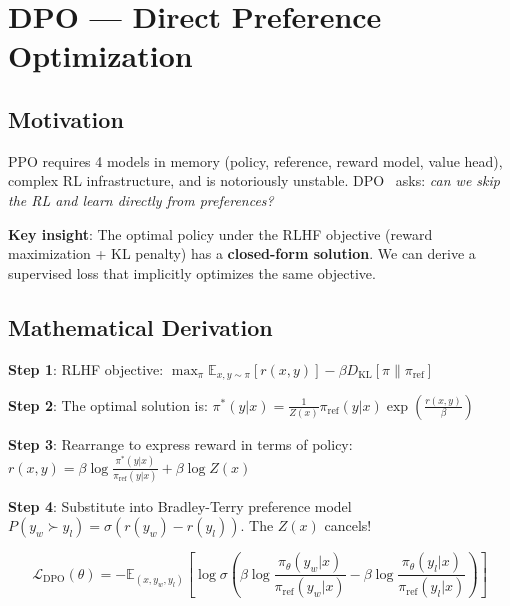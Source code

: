 \chapter{DPO --- Direct Preference Optimization}
\label{dpo-direct-preference-optimization}

\section{Motivation}
\label{motivation}

PPO requires 4 models in memory (policy, reference, reward model, value head), complex RL infrastructure, and is notoriously unstable. DPO~\cite{rafailov2023direct} asks: \emph{can we skip the RL and learn directly from preferences?}

\textbf{Key insight}: The optimal policy under the RLHF objective (reward maximization + KL penalty) has a \textbf{closed-form solution}. We can derive a supervised loss that implicitly optimizes the same objective.

\section{Mathematical Derivation}
\label{mathematical-derivation}

\textbf{Step 1}: RLHF objective: $\max_\pi \mathbb{E}_{x,y\sim\pi}[r(x,y)] - \beta D_\text{KL}[\pi\|\pi_\text{ref}]$

\textbf{Step 2}: The optimal solution is: $\pi^*(y|x) = \frac{1}{Z(x)} \pi_\text{ref}(y|x) \exp\left(\frac{r(x,y)}{\beta}\right)$

\textbf{Step 3}: Rearrange to express reward in terms of policy: $r(x,y) = \beta \log \frac{\pi^*(y|x)}{\pi_\text{ref}(y|x)} + \beta \log Z(x)$

\textbf{Step 4}: Substitute into Bradley-Terry preference model $P(y_w \succ y_l) = \sigma(r(y_w) - r(y_l))$. The $Z(x)$ cancels!

\begin{equation}
\boxed{\mathcal{L}_\text{DPO}(\theta) = -\mathbb{E}_{(x, y_w, y_l)}\left[\log\sigma\left(\beta\log\frac{\pi_\theta(y_w|x)}{\pi_\text{ref}(y_w|x)} - \beta\log\frac{\pi_\theta(y_l|x)}{\pi_\text{ref}(y_l|x)}\right)\right]}
\end{equation}

